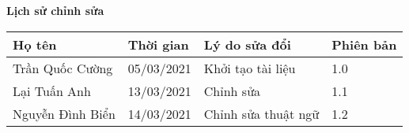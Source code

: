 \documentclass[./main.tex]{subfiles}
\begin{document}
	\begin{center}
		\Large{\textbf{Lịch sử chỉnh sửa}}
		\begin{table}[H]
			\begin{tabular}{|l|l|l|l|}
				\hline
				\textbf{Họ tên}  & \textbf{Thời gian} & \textbf{Lý do sửa đổi} & \textbf{Phiên bản} \\ \hline
				Trần Quốc Cường  & 05/03/2021         & Khởi tạo tài liệu      & 1.0                \\ \hline
				Lại Tuấn Anh     & 13/03/2021         & Chỉnh sửa              & 1.1                \\ \hline
				Nguyễn Đình Biển & 14/03/2021         & Chỉnh sửa thuật ngữ    & 1.2                \\ \hline
			\end{tabular}
		\end{table}
	\end{center}
	
\end{document}
